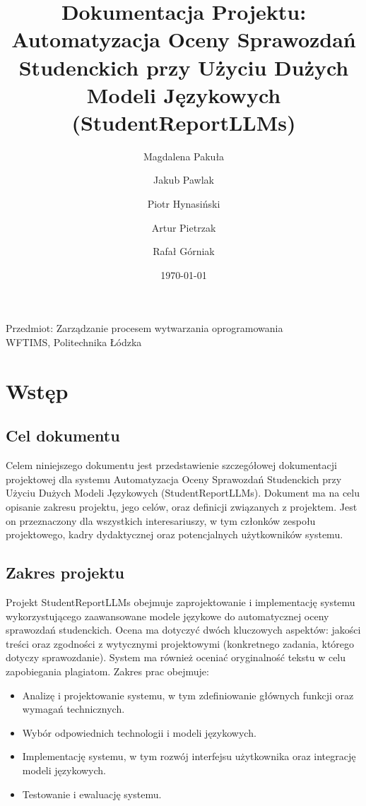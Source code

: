 \documentclass[a4paper, 12pt]{article}
\title{Dokumentacja Projektu: \\ Automatyzacja Oceny Sprawozdań Studenckich przy Użyciu Dużych Modeli Językowych (StudentReportLLMs)}
\author{
    Magdalena Pakuła \and
    Jakub Pawlak \and
    Piotr Hynasiński \and
    Artur Pietrzak \and
    Rafał Górniak
}
\date{\today}
\begin{document}
\maketitle

\vfill
\begin{center}
Przedmiot: Zarządzanie procesem wytwarzania oprogramowania \\
WFTIMS, Politechnika Łódzka
\end{center}

\newpage
\tableofcontents
\newpage

\section{Wstęp}
\subsection{Cel dokumentu}
Celem niniejszego dokumentu jest przedstawienie szczegółowej dokumentacji projektowej dla systemu Automatyzacja Oceny Sprawozdań Studenckich przy Użyciu Dużych Modeli Językowych (StudentReportLLMs).
Dokument ma na celu opisanie zakresu projektu, jego celów, oraz definicji związanych z projektem.
Jest on przeznaczony dla wszystkich interesariuszy, w tym członków zespołu projektowego, kadry dydaktycznej oraz potencjalnych użytkowników systemu.

\subsection{Zakres projektu}
Projekt StudentReportLLMs obejmuje zaprojektowanie i implementację systemu wykorzystującego zaawansowane modele językowe do automatycznej oceny sprawozdań studenckich.
Ocena ma dotyczyć dwóch kluczowych aspektów: jakości treści oraz zgodności z wytycznymi projektowymi (konkretnego zadania, którego dotyczy sprawozdanie).
System ma również oceniać oryginalność tekstu w celu zapobiegania plagiatom.
Zakres prac obejmuje:

\begin{itemize}
    \item Analizę i projektowanie systemu, w tym zdefiniowanie głównych funkcji oraz wymagań technicznych.
    \item Wybór odpowiednich technologii i modeli językowych.
    \item Implementację systemu, w tym rozwój interfejsu użytkownika oraz integrację modeli językowych.
    \item Testowanie i ewaluację systemu.
\end{itemize}
\end{document}
